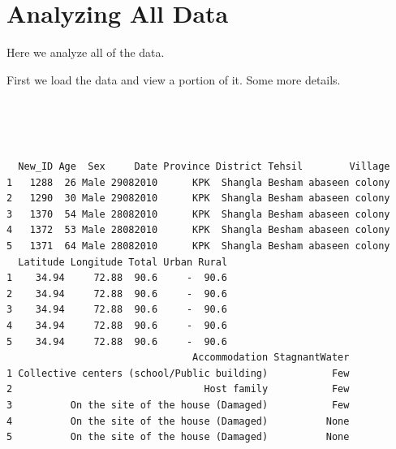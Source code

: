 \section{Analyzing All Data}
\label{sec:overall}
Here we analyze all of the data.

First we load the data and view a portion of it. Some more details.
\begin{knitrout}
\color{fgcolor}\begin{kframe}
\begin{flushleft}
\ttfamily\noindent
{}\hlkeyword{(}\hlkeyword{)}\hspace*{\fill}\\
\hlstd{}\hlkeyword{(}\hlkeyword{)}\hspace*{\fill}\\
\hlstd{}\hlkeyword{(}\hlkeyword{)}\hspace*{\fill}\\
\hlstd{}\hlkeyword{(}\hlkeyword{,}{\ }\hlargument{=}{\ }\hlkeyword{)}\mbox{}
\normalfont
\end{flushleft}
\begin{verbatim}
  New_ID Age  Sex     Date Province District Tehsil        Village
1   1288  26 Male 29082010      KPK  Shangla Besham abaseen colony
2   1290  30 Male 29082010      KPK  Shangla Besham abaseen colony
3   1370  54 Male 28082010      KPK  Shangla Besham abaseen colony
4   1372  53 Male 28082010      KPK  Shangla Besham abaseen colony
5   1371  64 Male 28082010      KPK  Shangla Besham abaseen colony
  Latitude Longitude Total Urban Rural
1    34.94     72.88  90.6     -  90.6
2    34.94     72.88  90.6     -  90.6
3    34.94     72.88  90.6     -  90.6
4    34.94     72.88  90.6     -  90.6
5    34.94     72.88  90.6     -  90.6
                                Accommodation StagnantWater
1 Collective centers (school/Public building)           Few
2                                 Host family           Few
3          On the site of the house (Damaged)           Few
4          On the site of the house (Damaged)          None
5          On the site of the house (Damaged)          None
\end{verbatim}
\end{kframe}
\end{knitrout}





